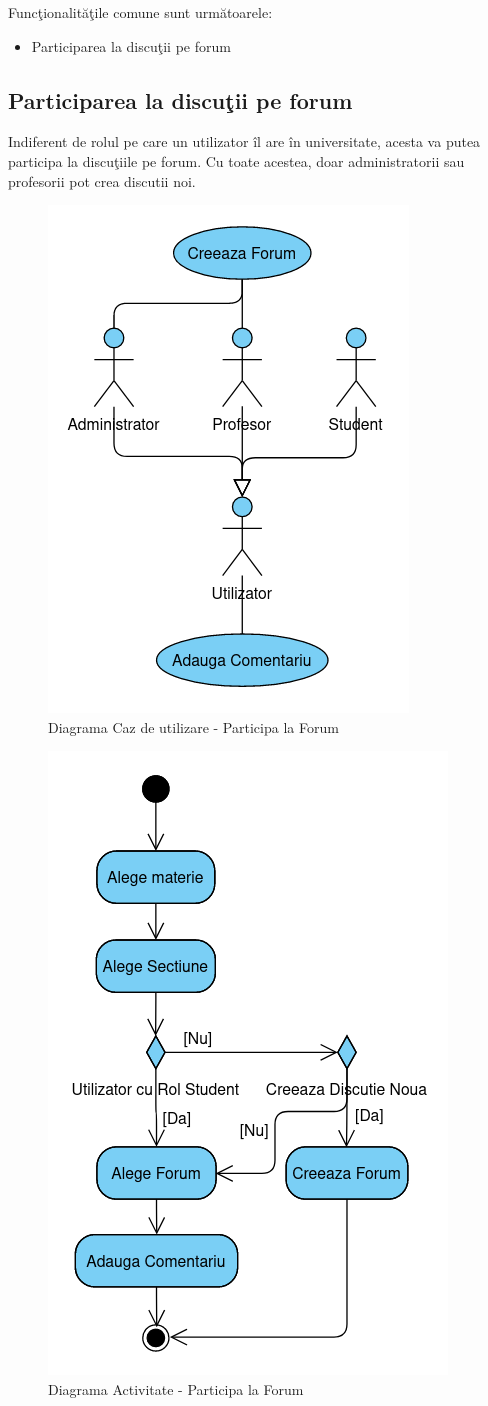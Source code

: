 \documentclass[12pt, a4paper, oneside, romanian]{teza-upb}
\begin{document}
Funcţionalităţile comune sunt următoarele:
\begin{itemize}
	\item Participarea la discuţii pe forum
\end{itemize}

\subsection{Participarea la discuţii pe forum}

Indiferent de rolul pe care un utilizator îl are în universitate, acesta va putea participa la discuţiile pe forum. Cu toate acestea, doar administratorii sau profesorii pot crea discutii noi.

\begin{figure}[H]
\centering
\includegraphics*[width=0.45\columnwidth]{diagrama-use-case-participa-la-forum}
\caption{Diagrama Caz de utilizare - Participa la Forum}
\label{diagrama-use-case-participa-la-forum}
\end{figure}

\begin{figure}[H]
\centering
\includegraphics*[width=0.5\columnwidth]{diagrama-activitate-participa-la-forum}
\caption{Diagrama Activitate - Participa la Forum}
\label{diagrama-activitate-participa-la-forum}
\end{figure}
\end{document}
